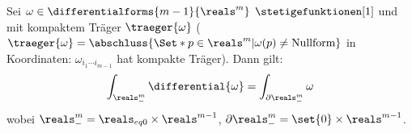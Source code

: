 \begin{satz}
  \label{stokes_spezialfall}
  Sei \( \omega\in\differentialforms{m-1}{\reals^m} \) \( \stetigefunktionen[1] \) und mit kompaktem Träger \( \traeger{\omega} \)
  (\( \traeger{\omega}=\abschluss{\Set*{p\in\reals^m| \omega(p)\neq \text{Nullform}}} \) in Koordinaten: \( \omega_{i_1\cdots i_{m-1}} \) hat kompakte Träger).
  Dann gilt:
  \begin{equation*}
      \int_{\reals_-^m}\differential{\omega}=\int_{\partial\reals_-^m}\omega
  \end{equation*}
  wobei \( \reals_-^m=\reals_{eq 0}\times \reals^{m-1}\), \( \partial\reals_-^m=\set{0}\times \reals^{m-1} \).
\end{satz}


